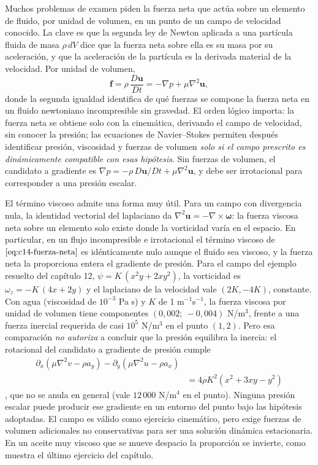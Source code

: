 \documentclass[10pt,openany]{book}
\begin{document}
Muchos problemas de examen piden la fuerza neta que actúa sobre un elemento de fluido, por unidad de volumen, en un punto de un campo de velocidad conocido. La clave es que la segunda ley de Newton aplicada a una partícula fluida de masa \(\rho\,dV\) dice que la fuerza neta sobre ella es su masa por su aceleración, y que la aceleración de la partícula es la derivada material de la velocidad. Por unidad de volumen,
\begin{equation}
\mathbf{f} = \rho\,\frac{D\mathbf{u}}{Dt} = -\nabla p + \mu\nabla^{2}\mathbf{u}, \label{eq:c14-fuerza-neta}
\end{equation}
donde la segunda igualdad identifica de qué fuerzas se compone la fuerza neta en un fluido newtoniano incompresible sin gravedad. El orden lógico importa: la fuerza neta se obtiene solo con la cinemática, derivando el campo de velocidad, sin conocer la presión; las ecuaciones de Navier--Stokes permiten después identificar presión, viscosidad y fuerzas de volumen \emph{solo si el campo prescrito es dinámicamente compatible con esas hipótesis}. Sin fuerzas de volumen, el candidato a gradiente es \(\nabla p = -\rho\,D\mathbf{u}/Dt + \mu\nabla^{2}\mathbf{u}\), y debe ser irrotacional para corresponder a una presión escalar.

El término viscoso admite una forma muy útil. Para un campo con divergencia nula, la identidad vectorial del laplaciano da \(\nabla^{2}\mathbf{u} = -\nabla\times\boldsymbol{\omega}\): la fuerza viscosa neta sobre un elemento solo existe donde la vorticidad varía en el espacio. En particular, en un flujo incompresible e irrotacional el término viscoso de \(\eqref{eq:c14-fuerza-neta}\) es idénticamente nulo aunque el fluido sea viscoso, y la fuerza neta la proporciona entera el gradiente de presión. Para el campo del ejemplo resuelto del capítulo 12, \(\psi = K\,(x^{2}y + 2xy^{2})\), la vorticidad es \(\omega_z = -K\,(4x + 2y)\) y el laplaciano de la velocidad vale \((2K, -4K)\), constante. Con agua (viscosidad de \(10^{-3}\) Pa s) y \(K\) de 1 m\(^{-1}\)s\(^{-1}\), la fuerza viscosa por unidad de volumen tiene componentes \((0{,}002;\ -0{,}004)\) N/m\(^3\), frente a una fuerza inercial requerida de casi \(10^{5}\) N/m\(^3\) en el punto \((1,2)\). Pero esa comparación \emph{no autoriza} a concluir que la presión equilibra la inercia: el rotacional del candidato a gradiente de presión cumple \[\begin{aligned}\partial_x(\mu\nabla^{2}v-\rho a_y)-\partial_y(\mu\nabla^{2}u-\rho a_x)\\ &=4\rho K^{2}(x^{2}+3xy-y^{2})\end{aligned}\], que no se anula en general (vale \(12\,000\) N/m\(^4\) en el punto). Ninguna presión escalar puede producir ese gradiente en un entorno del punto bajo las hipótesis adoptadas. El campo es válido como ejercicio cinemático, pero exige fuerzas de volumen adicionales no conservativas para ser una solución dinámica estacionaria. En un aceite muy viscoso que se mueve despacio la proporción se invierte, como muestra el último ejercicio del capítulo.
\end{document}

